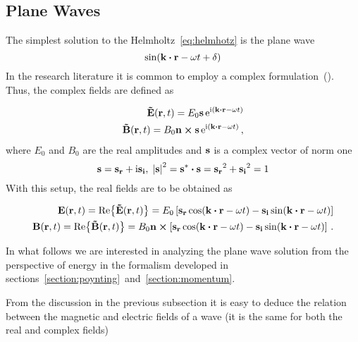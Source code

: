 \documentclass[12pt, class=report, crop=false]{standalone}
\begin{document}
\subsection{Plane Waves}

The simplest solution to the Helmholtz~\cref{eq:helmhotz} is the plane wave
\begin{equation}
  \sin(\vb{k}\vdot\vb{r} - \omega t + \delta)
\end{equation}
In the research literature it is common to employ a complex formulation~(\cite{vrejoiuElectrodinamicaSiTeoria1987}). Thus, the complex fields are defined as

\begin{subequations}
  \begin{align}
    \label{def:complex-field}
    \vb{\tilde{E}}(\vb{r},t) = E_0 \vb{s} \ee^{\ii (\vb{k}\vdot\vb{r} - \omega t)} \\
    \vb{\tilde{B}}(\vb{r},t) = B_0 \vb{n}\cp\vb{s} \ee^{\ii (\vb{k}\vdot\vb{r} - \omega t)} \,,
  \end{align}
\end{subequations}
where \(E_0\) and \(B_0\) are the real amplitudes and \(\vb{s}\) is a complex vector of norm one
\begin{equation*}
  \vb{s} = \vb{s_r} + \ii \vb{s_i}, \; \abs{\vb{s}}^2 = \vb{s^*}\vdot\vb{s} = \vb{s_r}^{2} + \vb{s_i}^{2} =1
\end{equation*}
With this setup, the real fields are to be obtained as

\begin{subequations}
  \begin{align}
    \label{def:real-electric-field}
    \vb{E}(\vb{r},t) = \Re{\vb{\tilde{E}}(\vb{r},t)} = E_0 \left[\vb{s_r} \cos(\vb{k}\vdot\vb{r} - \omega t) - \vb{s_i} \sin(\vb{k}\vdot\vb{r} - \omega t) \right] \\
    \vb{B}(\vb{r},t) = \Re{\vb{\tilde{B}}(\vb{r},t)} = B_0 \vb{n}\cp\left[\vb{s_r} \cos(\vb{k}\vdot\vb{r} - \omega t) - \vb{s_i} \sin(\vb{k}\vdot\vb{r} - \omega t) \right] \,.
  \end{align}
\end{subequations}

\par
In what follows we are interested in analyzing the plane wave solution from the perspective of energy in the formalism developed in sections~\ref{section:poynting}~and~\ref{section:momentum}.

\par
From the discussion in the previous subsection it is easy to deduce the relation between the magnetic and electric fields of a wave (it is the same for both the real and complex fields)
\end{document}
